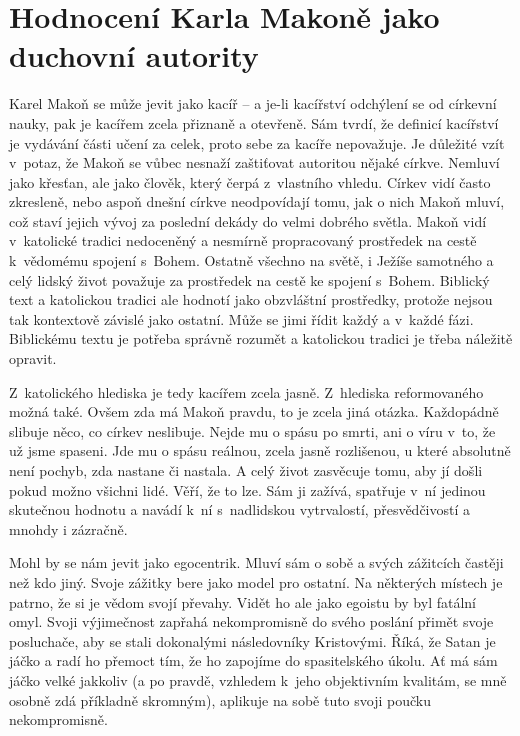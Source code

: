 \section{Hodnocení Karla Makoně jako duchovní autority}

Karel Makoň se může jevit jako kacíř -- a je-li kacířství odchýlení se od
církevní nauky, pak je kacířem zcela přiznaně a otevřeně. Sám tvrdí, že definicí
kacířství je vydávání části učení za celek, proto sebe za kacíře nepovažuje. Je
důležité vzít v~potaz, že Makoň se vůbec nesnaží zaštiťovat autoritou nějaké
církve. Nemluví jako křesťan, ale jako člověk, který čerpá z~vlastního vhledu.
Církev vidí často zkresleně, nebo aspoň dnešní církve neodpovídají tomu, jak o
nich Makoň mluví, což staví jejich vývoj za poslední dekády do velmi dobrého
světla. Makoň vidí v~katolické tradici nedoceněný a nesmírně propracovaný
prostředek na cestě k~vědomému spojení s~Bohem. Ostatně všechno na světě, i
Ježíše samotného a celý lidský život považuje za prostředek na cestě ke spojení
s~Bohem. Biblický text a katolickou tradici ale hodnotí jako obzvláštní
prostředky, protože nejsou tak kontextově závislé jako ostatní. Může se jimi
řídit každý a v~každé fázi. Biblickému textu je potřeba správně rozumět a
katolickou tradici je třeba náležitě opravit.

Z~katolického hlediska je tedy kacířem zcela jasně. Z~hlediska reformovaného
možná také. Ovšem zda má Makoň pravdu, to je zcela jiná otázka. Každopádně
slibuje něco, co církev neslibuje. Nejde mu o spásu po smrti, ani o víru v~to,
že už jsme spaseni. Jde mu o spásu reálnou, zcela jasně rozlišenou, u které
absolutně není pochyb, zda nastane či nastala. A celý život zasvěcuje tomu, aby
jí došli pokud možno všichni lidé. Věří, že to lze. Sám ji zažívá, spatřuje v~ní
jedinou skutečnou hodnotu a navádí k~ní s~nadlidskou vytrvalostí, přesvědčivostí
a mnohdy i zázračně.

Mohl by se nám jevit jako egocentrik. Mluví sám o sobě a svých zážitcích častěji
než kdo jiný. Svoje zážitky bere jako model pro ostatní. Na některých místech je
patrno, že si je vědom svojí převahy. Vidět ho ale jako egoistu by byl
fatální omyl. Svoji výjimečnost zapřahá nekompromisně do svého poslání přimět
svoje posluchače, aby se stali dokonalými následovníky Kristovými. Říká, že
Satan je jáčko a radí ho přemoct tím, že ho zapojíme do spasitelského úkolu. Ať
má sám jáčko velké jakkoliv (a po pravdě, vzhledem k~jeho objektivním kvalitám,
se mně osobně zdá příkladně skromným), aplikuje na sobě tuto svoji poučku
nekompromisně.

